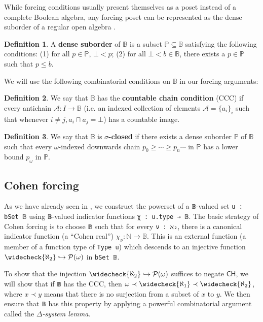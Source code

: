 \documentclass[sigplan,10pt,review, anonymous]{acmart}
\newcommand{\B}{\mathbb{B}}
\newcommand{\lil}{\lstinline}
\newcommand{\N}{\mathbb{N}}
\newcommand{\CH}{\mathsf{CH}}
\theoremstyle{definition}
\newtheorem{defn}{Definition}[section]
\begin{document}
While forcing conditions usually present themselves as a poset instead of a complete Boolean algebra, any forcing poset can be represented as the dense suborder of a regular open algebra \cite{moore2019method}.

\begin{defn}\label{def:dense-suborder}
  A \textbf{dense suborder} of \(\B\) is a subset \(\mathbb{P} \subseteq \B\) satisfying the following conditions: (1) for all \(p \in \mathbb{P}\), \(\bot < p\); (2) for all \(\bot < b \in \B\), there exists a \(p \in \mathbb{P}\) such that \(p \leq b\).
\end{defn}

We will use the following combinatorial conditions on \(\mathbb{B}\) in our forcing arguments:

\begin{defn}\label{def:ccc}
We say that $\B$ has the \textbf{countable chain condition} (CCC) if every antichain $\mathcal{A} : I \to \B$ (i.e. an indexed collection of elements $\mathcal{A} = \{a_i\}_i$ such that whenever $i \neq j, a_i \sqcap a_j = \bot$) has a countable image.
\end{defn}

\begin{defn}\label{def:sigma-closed}
We say that \(\B\) is \textbf{\(\sigma\)-closed} if there exists a dense suborder \(\mathbb{P}\) of \(\B\) such that every \(\omega\)-indexed downwards chain \(p_0 \geq \cdots \geq p_n \cdots\) in \(\mathbb{P}\) has a lower bound \(p_{\omega}\) in \(\mathbb{P}\).
\end{defn}

\subsection{Cohen forcing}

As we have already seen in , we construct the powerset of a \lil{𝔹}-valued set \lstinline{u : bSet 𝔹} using \lil{𝔹}-valued indicator functions \lil{χ : u.type → 𝔹}.
The basic strategy of Cohen forcing is to choose \lil{𝔹} such that for every \lil{ν : ℵ₂}, there is a canonical indicator function (a ``Cohen real'') \(\chi_{\nu} : \N \to \mathbb{B}\).
This is an external function (a member of a function type of \lstinline{Type u}) which descends to an injective function \(\widecheck{\aleph_2} \hookrightarrow \mathcal{P}(\omega)\) in \lil{bSet 𝔹}.

To show that the injection \(\widecheck{\aleph_2} \hookrightarrow \mathcal{P}(\omega)\)  suffices to negate \(\CH\), we will show that if \lil{𝔹} has the CCC, then \(\omega \prec \widecheck{\aleph_1} \prec \widecheck{\aleph_2}\), where $x\prec y$ means that there is no surjection from a subset of $x$ to $y$. We then ensure that \lil{𝔹} has this property by applying a powerful combinatorial argument called the \emph{\(\Delta\)-system lemma}.
\end{document}
